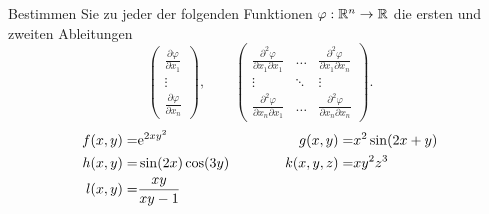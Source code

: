  {
Bestimmen Sie zu  jeder der folgenden Funktionen $\varphi:\mathbb{R}^n\rightarrow \mathbb{R}$ die ersten und zweiten Ableitungen
$$\begin{pmatrix}\frac{\partial \varphi}{\partial x_1}\\\vdots\\\frac{\partial \varphi}{\partial
x_n}\end{pmatrix},\qquad \begin{pmatrix}\frac{\partial^2 \varphi}{\partial x_1\partial
x_1}&\hdots& \frac{\partial^2\varphi}{\partial x_1 \partial x_n}\\
\vdots&\ddots&\vdots\\
\frac{\partial^2 \varphi}{\partial x_n\partial x_1}&\hdots&\frac{\partial^2 \varphi}{\partial
x_n\partial x_n}\end{pmatrix}.$$
\begin{align*}
f(x,y)=& \mathrm{e}^{2xy^2}&\qquad&&g(x,y)=& x^2\sin(2x+y)\\
h(x,y)=& \sin(2x)\cos(3y)&&&k(x,y,z)=&xy^2z^3\\
l(x,y)=&\frac{xy}{xy-1}
\end{align*}


}


